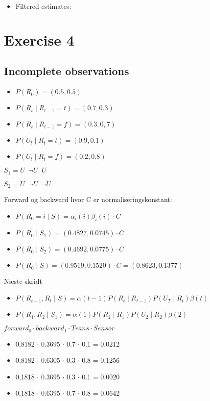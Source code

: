 \documentclass[colorlinks=true,linkcolor=blue]{article}
\begin{document}
\begin{itemize}
\item Filtered estimates:
\end{itemize}

\section{Exercise 4}
\label{sec-4}
\subsection{Incomplete observations}
\label{sec-4-1}
\begin{itemize}
\item $P(R_0) = (0.5, 0.5)$
\item $P(R_t \mid R_{t-1} = t) = (0.7, 0.3)$
\item $P(R_t \mid R_{t-1} = f) = (0.3, 0,7)$
\item $P(U_t \mid R_t = t) = (0.9, 0.1)$
\item $P(U_t \mid R_t = f) = (0.2, 0.8)$
\end{itemize}

$S_1 = U \;\; \neg U \;\; U$

$S_2 = U \;\; \neg U \;\; \neg U$ 

Forward og backward hvor C er normaliseringskonstant:
\begin{itemize}
\item $P(R_0 = i\mid S) = \alpha_i(i)\beta_i(i) \cdot C$
\item $P(R_0 \mid S_1) = (0.4827, 0.0745) \cdot C$
\item $P(R_0 \mid S_2) = (0.4692, 0.0775) \cdot C$
\item $P(R_0 \mid S) = (0.9519, 0.1520) \cdot  C = (0.8623, 0.1377)$
\end{itemize}

Næste skridt
\begin{itemize}
\item $P(R_{t-1}, R_t \mid S) = \alpha(t-1) P(R_t \mid R_{t-1}) P(U_T \mid R_t) \beta(t)$
\item $P(R_1, R_2 \mid S_1) = \alpha(1)P(R_2 \mid R_1)P(U_2 \mid R_2)\beta(2)$
\end{itemize}

$forward_0 \cdot backward_1 \cdot Trans \cdot Sensor$
\begin{itemize}
\item 0,8182 $\cdot$ 0.3695 $\cdot$ 0.7 $\cdot$ 0.1 = 0.0212
\item 0,8182 $\cdot$ 0.6305 $\cdot$ 0.3 $\cdot$ 0.8 = 0.1256
\item 0,1818 $\cdot$ 0.3695 $\cdot$ 0.3 $\cdot$ 0.1 = 0.0020
\item 0,1818 $\cdot$ 0.6395 $\cdot$ 0.7 $\cdot$ 0.8 = 0.0642
\end{itemize}
\end{document}
